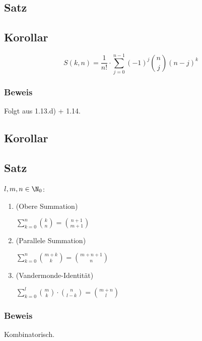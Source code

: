 \subsection{Satz} %

\subsection{Korollar} %

\[ S(k,n) = \frac{1}{n!}\cdot \sum_{j=0}^{n-1}(-1)^j\binom{n}{j}(n-j)^k \]

\subsubsection*{Beweis}

Folgt aus 1.13.d) + 1.14. %

\subsection{Korollar} %

\subsection{Satz} %
$l, m, n \in \N_0$:

\begin{enumerate}
	\item (Obere Summation)
	
	$\sum_{k=0}^{n}\binom{k}{n} = \binom{n+1}{m+1} $
	
	\item (Parallele Summation)
	
	$\sum_{k=0}^{n}\binom{m+k}{k} = \binom{m+n+1}{n} $
	
	\item (Vandermonde-Identität)
	
	$ \sum_{k=0}^{l}\binom{m}{k}\cdot\binom{n}{l-k} = \binom{m+n}{l} $   
	
\end{enumerate}

\subsubsection*{Beweis}

Kombinatorisch.

